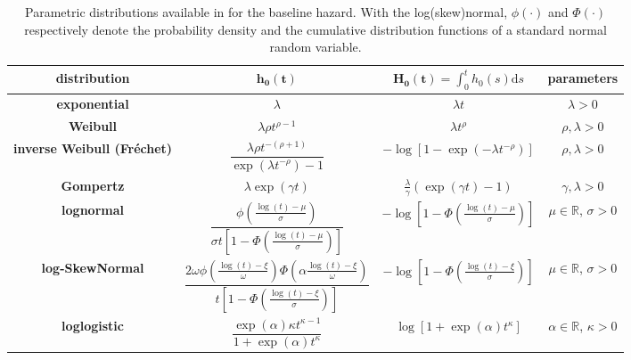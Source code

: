 \begin{sidewaystable}[] \centering \doublespacing
\caption{Parametric distributions available in  for the baseline hazard.
    With the log(skew)normal, $\phi(\cdot)$ and $\Phi(\cdot)$ respectively denote the probability density and the cumulative distribution functions of a standard normal random variable.}
\label{tab:model.baselines}	
\renewcommand{\arraystretch}{1.5}
  \begin{tabular}{cccc}
  \hline \hline
  {\bf distribution}
    & $\bm{h_{0}(t)}$
    & $\bm{H_{0}(t)} = \int_{0}^{t} h_{0} ( s ) \textrm{d} s$
    & {\bf parameters}
  \\ %
  \hline
  {\bf exponential}
    & $\lambda$
    & $\lambda t$
    & $\lambda > 0$
  \\ %
  {\bf Weibull}
    & $\lambda \rho t^{\rho - 1}$
    & $\lambda t^{\rho}$
    & $\rho, \lambda > 0$
  \\ %
  {\bf inverse Weibull (Fr\'echet)}
    & $\dfrac{\lambda \rho t^{-(\rho + 1)}}{\exp(\lambda t^{-\rho}) - 1}$
    & $-\log\left[1 - \exp(-\lambda t^{-\rho})\right]$
    & $\rho, \lambda > 0$
  \\ %
  {\bf Gompertz}
    & $\lambda \exp ( \gamma t )$
    & $\frac{\lambda}{\gamma} \left(\exp (\gamma t) - 1\right)$
    & $\gamma, \lambda > 0$
  \\ %
  {\bf lognormal}
    & $\dfrac{\phi \left(\frac{\log(t) - \mu}{\sigma} \right)}
	      		   {\sigma t \left[1 - \Phi\left(\frac{\log(t) - \mu}{\sigma} \right) \right]}$
    & $- \log \left[1 - \Phi\left(\frac{\log(t) - \mu}{\sigma} \right)\right]$
    & $\mu \in \mathbb{R}$, $\sigma > 0$
  \\[2em] %
  {\bf log-SkewNormal}
    & $\dfrac{
        2 \omega
        \phi\left(\frac{\log(t) - \xi}{\omega}\right)
        \Phi\left(\alpha\frac{\log(t)-\xi}{\omega}\right)
        }{
         t \left[1 - \Phi\left(\frac{\log(t) - \xi}{\sigma} \right) \right]}$
    & $- \log \left[1 - \Phi\left(\frac{\log(t) - \xi}{\sigma} \right)\right]$
    & $\mu \in \mathbb{R}$, $\sigma > 0$
  \\ %
  {\bf loglogistic}
    & $\dfrac{\exp(\alpha) \kappa t^{\kappa - 1}}{1 + \exp(\alpha) t^{\kappa}}$
    & $\log \left[1 + \exp(\alpha) t^{\kappa}\right]$
    & $\alpha \in \mathbb{R}$, $\kappa > 0$
    \\
	\hline \hline
	\end{tabular}
\end{sidewaystable} 
\singlespacing